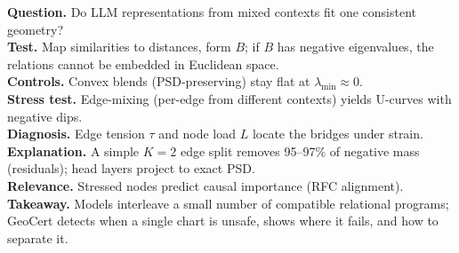 \documentclass[11pt]{article}
\newcommand{\1}{\mathbf{1}}
\begin{document}
\begin{tcolorbox}[title=Executive Summary]
\textbf{Question.} Do LLM representations from mixed contexts fit one consistent geometry? \\
\textbf{Test.} Map similarities to distances, form $B$; if $B$ has negative eigenvalues, the relations cannot be embedded in Euclidean space. \\
\textbf{Controls.} Convex blends (PSD-preserving) stay flat at $\lambda_{\min}\!\approx\!0$. \\
\textbf{Stress test.} Edge-mixing (per-edge from different contexts) yields U-curves with negative dips. \\
\textbf{Diagnosis.} Edge tension $\tau$ and node load $L$ locate the bridges under strain. \\
\textbf{Explanation.} A simple $K{=}2$ edge split removes 95--97\% of negative mass (residuals); head layers project to exact PSD. \\
\textbf{Relevance.} Stressed nodes predict causal importance (RFC alignment). \\
\textbf{Takeaway.} Models interleave a small number of compatible relational programs; GeoCert detects when a single chart is unsafe, shows where it fails, and how to separate it.
\end{tcolorbox}

\end{document}
